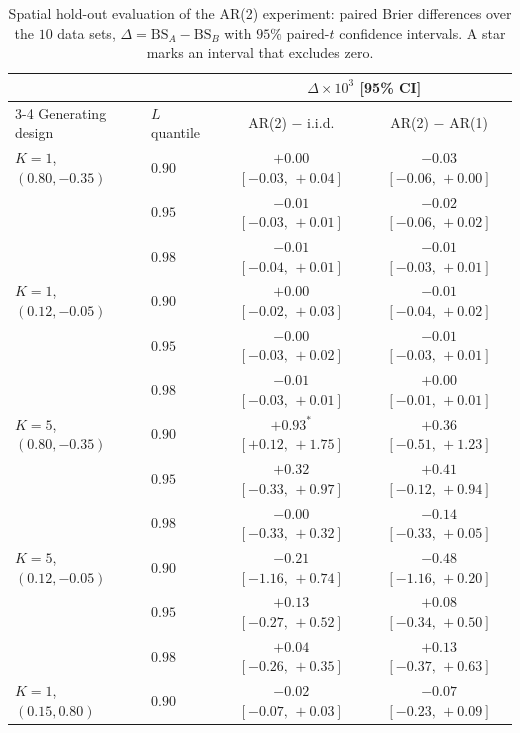 \documentclass[12pt]{article}
\begin{document}
\begin{table}[htbp]
\centering
\caption[Spatial hold-out evaluation of the AR(2) experiment: paired Brier differences]{Spatial hold-out evaluation of the AR(2) experiment: paired Brier differences over the $10$ data sets, $\Delta = \mathrm{BS}_A - \mathrm{BS}_B$ with $95\%$ paired-$t$ confidence intervals. A star marks an interval that excludes zero.}
\label{tab:ar2-sim-paired}
\scriptsize
\begin{tabular}{@{}ll cc@{}}
\toprule
& & \multicolumn{2}{c}{$\Delta\times10^{3}$ [95\% CI]} \\
\cmidrule(lr){3-4}
Generating design & $L$ quantile & AR(2) $-$ i.i.d. & AR(2) $-$ AR(1) \\
\midrule
$K{=}1$, $(0.80,-0.35)$ & $0.90$ & $+0.00$ {\tiny $[-0.03,\,+0.04]$} & $-0.03$ {\tiny $[-0.06,\,+0.00]$} \\
 & $0.95$ & $-0.01$ {\tiny $[-0.03,\,+0.01]$} & $-0.02$ {\tiny $[-0.06,\,+0.02]$} \\
 & $0.98$ & $-0.01$ {\tiny $[-0.04,\,+0.01]$} & $-0.01$ {\tiny $[-0.03,\,+0.01]$} \\
\addlinespace
$K{=}1$, $(0.12,-0.05)$ & $0.90$ & $+0.00$ {\tiny $[-0.02,\,+0.03]$} & $-0.01$ {\tiny $[-0.04,\,+0.02]$} \\
 & $0.95$ & $-0.00$ {\tiny $[-0.03,\,+0.02]$} & $-0.01$ {\tiny $[-0.03,\,+0.01]$} \\
 & $0.98$ & $-0.01$ {\tiny $[-0.03,\,+0.01]$} & $+0.00$ {\tiny $[-0.01,\,+0.01]$} \\
\addlinespace
$K{=}5$, $(0.80,-0.35)$ & $0.90$ & $+0.93^{*}$ {\tiny $[+0.12,\,+1.75]$} & $+0.36$ {\tiny $[-0.51,\,+1.23]$} \\
 & $0.95$ & $+0.32$ {\tiny $[-0.33,\,+0.97]$} & $+0.41$ {\tiny $[-0.12,\,+0.94]$} \\
 & $0.98$ & $-0.00$ {\tiny $[-0.33,\,+0.32]$} & $-0.14$ {\tiny $[-0.33,\,+0.05]$} \\
\addlinespace
$K{=}5$, $(0.12,-0.05)$ & $0.90$ & $-0.21$ {\tiny $[-1.16,\,+0.74]$} & $-0.48$ {\tiny $[-1.16,\,+0.20]$} \\
 & $0.95$ & $+0.13$ {\tiny $[-0.27,\,+0.52]$} & $+0.08$ {\tiny $[-0.34,\,+0.50]$} \\
 & $0.98$ & $+0.04$ {\tiny $[-0.26,\,+0.35]$} & $+0.13$ {\tiny $[-0.37,\,+0.63]$} \\
\midrule
$K{=}1$, $(0.15,0.80)$ & $0.90$ & $-0.02$ {\tiny $[-0.07,\,+0.03]$} & $-0.07$ {\tiny $[-0.23,\,+0.09]$} \\

\end{tabular}
\end{table}
\end{document}
